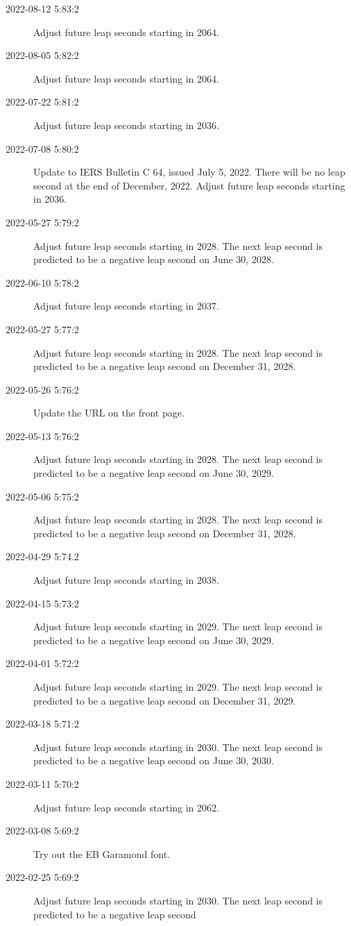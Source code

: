\documentclass[letterpaper,twoside]{article}
\begin{document}
\begin{description}
\item[2022-08-12 5:83:2]Adjust future leap seconds starting in 2064.
\item[2022-08-05 5:82:2]Adjust future leap seconds starting in 2064.
\item[2022-07-22 5:81:2]Adjust future leap seconds starting in 2036.
\item[2022-07-08 5:80:2]Update to IERS Bulletin C 64,
  issued July 5, 2022.
  There will be no leap second at the end of December, 2022.
  Adjust future leap seconds starting in 2036.
\item[2022-05-27 5:79:2]Adjust future leap seconds starting in 2028.
  The next leap second is predicted to be a negative leap second
  on June 30, 2028.
\item[2022-06-10 5:78:2]Adjust future leap seconds starting in 2037.
\item[2022-05-27 5:77:2]Adjust future leap seconds starting in 2028.
  The next leap second is predicted to be a negative leap second
  on December 31, 2028.
\item[2022-05-26 5:76:2]Update the URL on the front page.
\item[2022-05-13 5:76:2]Adjust future leap seconds starting in 2028.
  The next leap second is predicted to be a negative leap second
  on June 30, 2029.
\item[2022-05-06 5:75:2]Adjust future leap seconds starting in 2028.
  The next leap second is predicted to be a negative leap second
  on December 31, 2028.
\item[2022-04-29 5:74.2]Adjust future leap seconds starting in 2038.
\item[2022-04-15 5:73:2]Adjust future leap seconds starting in 2029.
  The next leap second is predicted to be a negative leap second
  on June 30, 2029.
\item[2022-04-01 5:72:2]Adjust future leap seconds starting in 2029.
  The next leap second is predicted to be a negative leap second
  on December 31, 2029.
\item[2022-03-18 5:71:2]Adjust future leap seconds starting in 2030.
  The next leap second is predicted to be a negative leap second
  on June 30, 2030.
\item[2022-03-11 5:70:2]Adjust future leap seconds starting in 2062.
\item[2022-03-08 5:69:2]Try out the EB Garamond font.
\item[2022-02-25 5:69:2]Adjust future leap seconds starting in 2030.
  The next leap second is predicted to be a negative leap second

\end{description}
\end{document}

